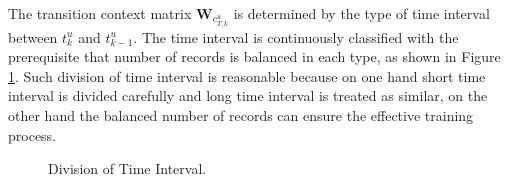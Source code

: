 \documentclass[conference]{IEEEtran}
\begin{document}
The transition context matrix $\textbf{W}_{c_{T,k}^{u}}$ is determined by the type of time interval between $t_k^u$ and $t_{k-1}^u$. The time interval is continuously classified with the prerequisite that number of records is balanced in each type, as shown in Figure \ref{fig:comparision}. Such division of time interval is reasonable because on one hand short time interval is divided carefully and long time interval is treated as similar, on the other hand the balanced number of records can ensure the effective training process.
\begin{figure}[!tb]
\centering
{}
\hspace{-1mm}
\caption{Division of Time Interval.}
\label{fig:comparision}
\end{figure}
\end{document}
